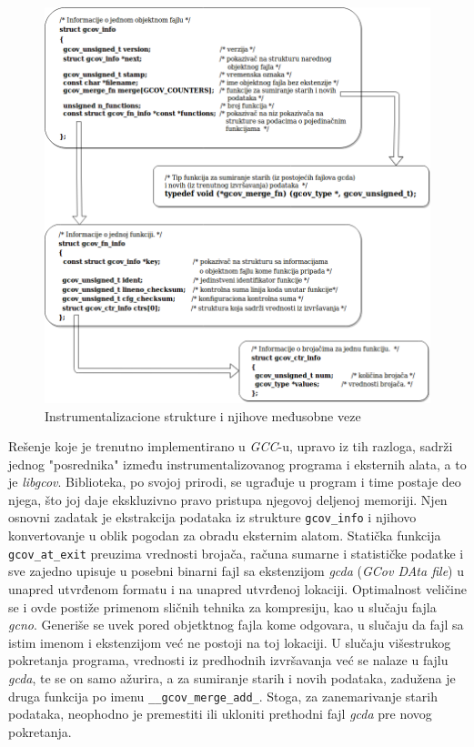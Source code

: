 \documentclass[12pt,oneside]{memoir}
\newcommand{\kod}[1]{\texttt{#1}}
\newcommand{\strano}[1]{\textit{#1}}
\begin{document}
\begin{figure}[!ht]
  \centering
  \includegraphics[width=\textwidth]{img/instr_strukture_3.png}
  \caption{Instrumentalizacione strukture i njihove međusobne veze}
  \label{fig:instr}
\end{figure}

Rešenje koje je trenutno implementirano u \strano{GCC}-u, upravo iz tih razloga, sadrži jednog "posrednika" između instrumentalizovanog programa i eksternih alata, a to je \strano{libgcov}. Biblioteka, po svojoj prirodi, se ugrađuje u program i time postaje deo njega, što joj daje ekskluzivno pravo pristupa njegovoj deljenoj memoriji. Njen osnovni zadatak je ekstrakcija podataka iz strukture \kod{gcov\_info} i njihovo konvertovanje u oblik pogodan za obradu eksternim alatom. Statička funkcija \kod{gcov\_at\_exit} preuzima vrednosti brojača, računa sumarne i statističke podatke i sve zajedno upisuje u posebni binarni fajl sa ekstenzijom \strano{gcda} (\strano{GCov DAta file}) u unapred utvrđenom formatu i na unapred utvrđenoj lokaciji. Optimalnost veličine se i ovde postiže primenom sličnih tehnika za kompresiju, kao u slučaju fajla \strano{gcno}. Generiše se uvek pored objetktnog fajla kome odgovara, u slučaju da fajl sa istim imenom i ekstenzijom već ne postoji na toj lokaciji. U slučaju višestrukog pokretanja programa, vrednosti iz predhodnih izvršavanja već se nalaze u fajlu \strano{gcda}, te se on samo ažurira, a za sumiranje starih i novih podataka, zadužena je druga funkcija po imenu \kod{\_\_gcov\_merge\_add\_}. Stoga, za zanemarivanje starih podataka, neophodno je premestiti ili ukloniti prethodni fajl \strano{gcda} pre novog pokretanja.  
\end{document}
